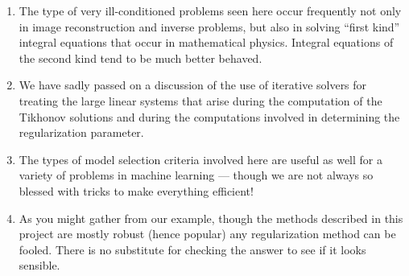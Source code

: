 \documentclass[12pt, leqno]{article} %
\begin{document}
\begin{enumerate}
\item
  The type of very ill-conditioned problems seen here occur frequently
  not only in image reconstruction and inverse problems, but also in
  solving ``first kind'' integral equations that occur in mathematical
  physics.  Integral equations of the second kind tend to be much
  better behaved.
\item
  We have sadly passed on a discussion of the use of iterative solvers
  for treating the large linear systems that arise during the computation
  of the Tikhonov solutions and during the computations involved in
  determining the regularization parameter.
\item
  The types of model selection criteria involved here are useful as well
  for a variety of problems in machine learning --- though we are not
  always so blessed with tricks to make everything efficient!
\item
  As you might gather from our example, though the methods described
  in this project are mostly robust (hence popular) any regularization
  method can be fooled.  There is no substitute for checking the answer
  to see if it looks sensible.
\end{enumerate}
\end{document}
